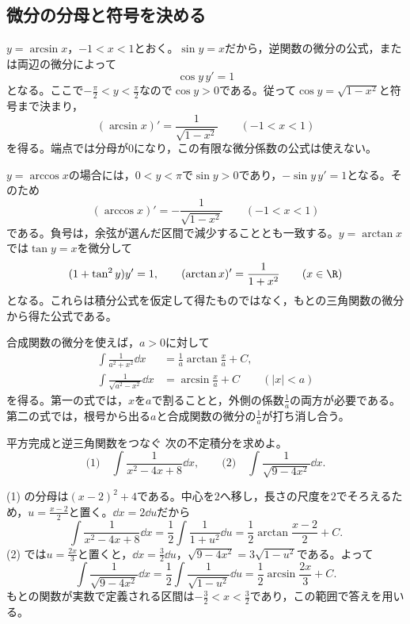 \subsection{微分の分母と符号を決める}

$y=\arcsin x$，$-1<x<1$とおく。$\sin y=x$だから，逆関数の微分の公式，または両辺の微分によって
\[
\cos y\,y'=1
\]
となる。ここで$-\frac\pi2<y<\frac\pi2$なので$\cos y>0$である。従って$\cos y=\sqrt{1-x^2}$と符号まで決まり，
\[
(\arcsin x)'=\frac1{\sqrt{1-x^2}}\qquad(-1<x<1)
\]
を得る。端点では分母が$0$になり，この有限な微分係数の公式は使えない。

$y=\arccos x$の場合には，$0<y<\pi$で$\sin y>0$であり，$-\sin y\,y'=1$となる。そのため
\[
(\arccos x)'=-\frac1{\sqrt{1-x^2}}\qquad(-1<x<1)
\]
である。負号は，余弦が選んだ区間で減少することとも一致する。$y=\arctan x$では$\tan y=x$を微分して
\[
(1+\tan^2y)y'=1,\qquad
(\arctan x)'=\frac1{1+x^2}\qquad(x\in\R)
\]
となる。これらは積分公式を仮定して得たものではなく，もとの三角関数の微分から得た公式である。

合成関数の微分を使えば，$a>0$に対して
\begin{equation}\label{式:逆三角関数の積分}
\begin{aligned}
\int\frac1{a^2+x^2}\dd x
 &=\frac1a\arctan\frac xa+C,\\
\int\frac1{\sqrt{a^2-x^2}}\dd x
 &=\arcsin\frac xa+C\qquad(|x|<a)
\end{aligned}
\end{equation}
を得る。第一の式では，$x$を$a$で割ることと，外側の係数$\frac1a$の両方が必要である。第二の式では，根号から出る$a$と合成関数の微分の$\frac1a$が打ち消し合う。

\begin{example}{平方完成と逆三角関数をつなぐ}
次の不定積分を求めよ。
\[
\text{(1)}\quad\int\frac1{x^2-4x+8}\dd x,
\qquad
\text{(2)}\quad\int\frac1{\sqrt{9-4x^2}}\dd x.
\]
\end{example}

(1) の分母は$(x-2)^2+4$である。中心を$2$へ移し，長さの尺度を$2$でそろえるため，$u=\frac{x-2}{2}$と置く。$\dd x=2\dd u$だから
\[
\int\frac1{x^2-4x+8}\dd x
=\frac12\int\frac1{1+u^2}\dd u
=\frac12\arctan\frac{x-2}{2}+C.
\]
(2) では$u=\frac{2x}{3}$と置くと，$\dd x=\frac32\dd u$，$\sqrt{9-4x^2}=3\sqrt{1-u^2}$である。よって
\[
\int\frac1{\sqrt{9-4x^2}}\dd x
=\frac12\int\frac1{\sqrt{1-u^2}}\dd u
=\frac12\arcsin\frac{2x}{3}+C.
\]
もとの関数が実数で定義される区間は$-\frac32<x<\frac32$であり，この範囲で答えを用いる。


